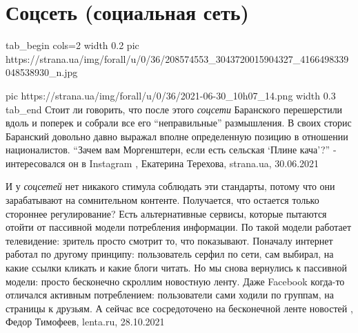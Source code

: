  
 
 
 
 
\chapter{Соцсеть (социальная сеть)}
\label{sec:slova.socset}

\ifcmt
tab_begin cols=2
  width 0.2
  pic https://strana.ua/img/forall/u/0/36/208574553_3043720015904327_4166498339048538930_n.jpg

  pic https://strana.ua/img/forall/u/0/36/2021-06-30_10h07_14.png
  width 0.3
tab_end
\fi
Стоит ли говорить, что после этого \emph{соцсети} Баранского перешерстили вдоль и
поперек и собрали все его \enquote{неправильные} размышления.  В своих сторис
Баранский довольно давно выражал вполне определенную позицию в отношении
националистов.  \enquote{Зачем вам Моргенштерн, если есть сельская
\enquote{Плине кача}?} - интересовался он в Instagram
, 
Екатерина Терехова, strana.ua, 30.06.2021

И у \emph{соцсетей} нет никакого стимула соблюдать эти стандарты, потому что
они зарабатывают на сомнительном контенте. Получается, что остается только
стороннее регулирование?  Есть альтернативные сервисы, которые пытаются отойти
от пассивной модели потребления информации. По такой модели работает
телевидение: зритель просто смотрит то, что показывают. Поначалу интернет
работал по другому принципу: пользователь серфил по сети, сам выбирал, на какие
ссылки кликать и какие блоги читать. Но мы снова вернулись к пассивной модели:
просто бесконечно скроллим новостную ленту.  Даже Facebook когда-то отличался
активным потреблением: пользователи сами ходили по группам, на страницы к
друзьям. А сейчас все сосредоточено на бесконечной ленте новостей
, 
Федор Тимофеев, lenta.ru, 28.10.2021
